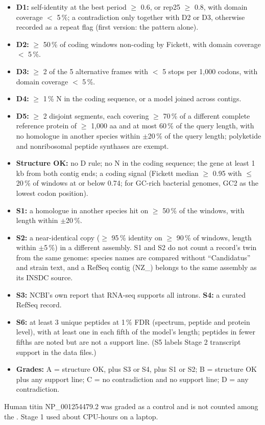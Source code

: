 \documentclass[11pt]{article}
\begin{document}
\begin{itemize}[leftmargin=*]
\item \textbf{D1:} self-identity at the best period $\geq$ 0.6, or rep25 $\geq$ 0.8, with domain coverage $<$ 5\,\%; a
contradiction only together with D2 or D3, otherwise recorded as a repeat flag (first version: the pattern alone).
\item \textbf{D2:} $\geq$ 50\,\% of coding windows non-coding by Fickett, with domain coverage $<$ 5\,\%.
\item \textbf{D3:} $\geq$ 2 of the 5 alternative frames with $<$ 5 stops per 1,000 codons, with domain coverage $<$ 5\,\%.
\item \textbf{D4:} $\geq$ 1\,\% N in the coding sequence, or a model joined across contigs.
\item \textbf{D5:} $\geq$ 2 disjoint segments, each covering $\geq$ 70\,\% of a different complete reference protein of
$\geq$ 1,000 aa and at most 60\,\% of the query length, with no homologue in another species within $\pm$20\,\% of the query
length; polyketide and nonribosomal peptide synthases are exempt.
\item \textbf{Structure OK:} no D rule; no N in the coding sequence; the gene at least 1 kb from both contig ends; a coding
signal (Fickett median $\geq$ 0.95 with $\leq$ 20\,\% of windows at or below 0.74; for GC-rich bacterial genomes, GC2 as the
lowest codon position).
\item \textbf{S1:} a homologue in another species hit on $\geq$ 50\,\% of the windows, with length within $\pm$20\,\%.
\item \textbf{S2:} a near-identical copy ($\geq$ 95\,\% identity on $\geq$ 90\,\% of windows, length within $\pm$5\,\%) in a
different assembly. S1 and S2 do not count a record's twin from the same genome: species names are compared without
``Candidatus'' and strain text, and a RefSeq contig (NZ\_) belongs to the same assembly as its INSDC source.
\item \textbf{S3:} NCBI's own report that RNA-seq supports all introns. \textbf{S4:} a curated RefSeq record.
\item \textbf{S6:} at least 3 unique peptides at 1\,\% FDR (spectrum, peptide and protein level), with at least one in each
fifth of the model's length; peptides in fewer fifths are noted but are not a support line. (S5 labels Stage 2 transcript
support in the data files.)
\item \textbf{Grades:} A = structure OK, plus S3 or S4, plus S1 or S2; B = structure OK plus any support line; C = no
contradiction and no support line; D = any contradiction.
\end{itemize}
Human titin NP\_001254479.2 was graded as a control and is not counted among the . Stage 1 used about
 CPU-hours on a laptop.
\end{document}
